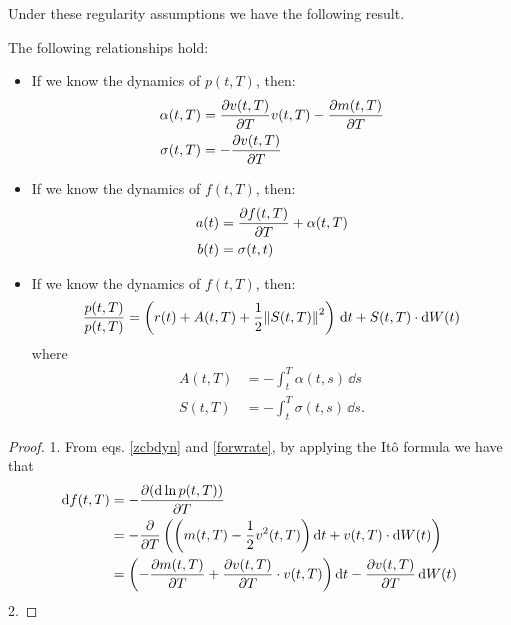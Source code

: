 Under these regularity assumptions we have the following result.
\begin{theorem}
    The following relationships hold:
    \begin{itemize}
        \item If we know the dynamics of $p(t,T)$, then:
        \begin{align}
            \alpha(t,T) &= \pdv{v(t,T)}{T}v(t,T) - \pdv{m(t,T)}{T} \\
            \sigma(t,T) &= -\pdv{v(t,T)}{T}
        \end{align}
        \item If we know the dynamics of $f(t,T)$, then:
        \begin{align}
            a(t) &= \pdv{f(t,T)}{T} + \alpha(t,T) \\
            b(t) &= \sigma(t,t)
        \end{align}
        \item If we know the dynamics of $f(t,T)$, then:
        \begin{align}
            \frac{p(t,T)}{p(t,T)} = \left(r(t) + A(t,T) + \frac{1}{2}\norm{S(t,T)}^2\right)\,\dd t + S(t,T)\cdot \dd W(t)
        \end{align}
        where
        \begin{align}
            A(t,T) &= -\int_t^T \alpha(t,s)\,\dd s \\
            S(t,T) &= -\int_t^T \sigma(t,s)\,\dd s.
        \end{align}
    \end{itemize}
\end{theorem}
\begin{proof}
    1. From eqs. \eqref{zcbdyn} and \eqref{forwrate}, by applying the Itô formula we have that
    \begin{align*}
        \dd f(t,T) &= - \pdv{(\dd\ln p(t,T))}{T}\\
        &=
        - \pdv{}{T} \left(\left(m(t,T) - \frac{1}{2}v^2(t,T)\right)\dd t + v(t,T)\cdot\dd W(t)\right) \\
        &=
        \left(- \pdv{m(t,T)}{T} + \pdv{v(t,T)}{T}\cdot v(t,T)\right)\dd t - \pdv{v(t,T)}{T}\,\dd W(t)
    \end{align*} %
    2.
\end{proof}
